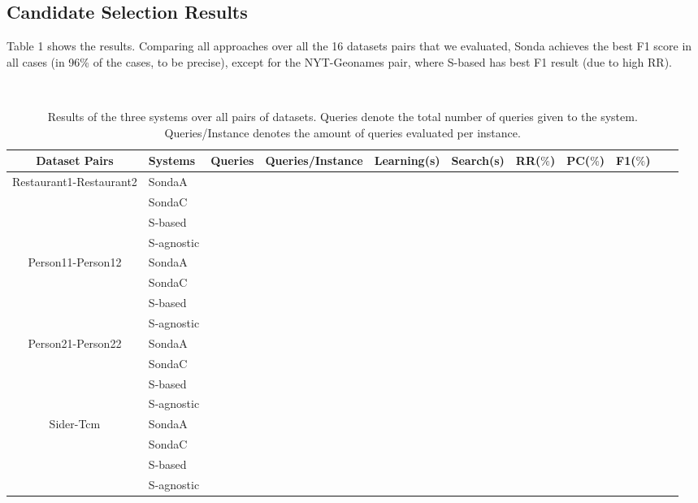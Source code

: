 \subsection{Candidate Selection Results} 
Table 1 shows the results. Comparing all approaches over all the 16 datasets pairs that we evaluated, Sonda achieves the best F1 score in all cases (in 96\% of the cases, to be precise), except for the NYT-Geonames pair, where S-based has best F1 result (due to high RR). 
 
\begin{center}
\begin{table*}[ht]
\centering
\scriptsize\tt
\caption{Results of the three systems over all pairs of datasets. Queries denote the total number of queries given to the system. Queries/Instance denotes the amount of queries evaluated per instance.} 
    \begin{tabular}{|c|l|c|c|c|c|c|c|c|c|c|}
        \hline
        Dataset Pairs & Systems & Queries & Queries/Instance & Learning(s) & Search(s)  & RR($\%$) & PC($\%$) &  F1($\%$) \\ \hline
 
\multirow{4}{*}{Restaurant1-Restaurant2} & SondaA           \\
											& SondaC  \\
											& S-based \\
 											& S-agnostic     \\ \hline
 											
\multirow{4}{*}{Person11-Person12} & SondaA    \\
											& SondaC  \\
											& S-based \\
 											& S-agnostic      \\ \hline

\multirow{4}{*}{Person21-Person22} & SondaA  \\
											& SondaC  \\
											& S-based \\
 											& S-agnostic       	\\ \hline 										

 \multirow{4}{*}{Sider-Tcm} & SondaA            \\
 											& SondaC  \\
											& S-based \\
 											& S-agnostic        \\ \hline
 											

\end{tabular}
\end{table*}
\end{center}

